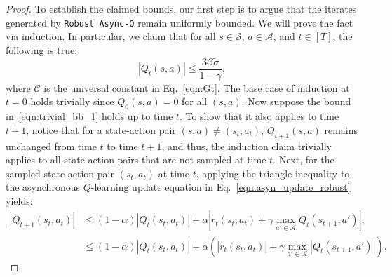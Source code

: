 \documentclass{article}
\begin{document}
\begin{proof}
To establish the claimed bounds, our first step is to argue that the iterates generated by \texttt{Robust Async-Q} remain uniformly bounded. We will prove the fact via induction. In particular, we claim that for all \(s \in \mathcal{S}\), \(a \in \mathcal{A}\), and \(t \in [T]\), the following is true: 
\begin{equation}\label{eqn:trivial_bb_1}
    \left| Q_t(s, a) \right| \le \frac{3 \mathcal{C} \tilde{\sigma}}{1 - \gamma},
\end{equation}
where $\mathcal{C}$ is the universal constant in Eq.~\eqref{eqn:Gt}. The base case of induction at $t=0$ holds trivially since $Q_0(s,a) = 0$ for all $(s,a)$. Now suppose the bound in~\eqref{eqn:trivial_bb_1} holds up to time $t$. To show that it also applies to time $t+1$, notice that for a state-action pair $(s, a) \neq (s_t, a_t)$,  $Q_{t+1}(s,a)$ remains unchanged from time $t$ to time $t+1$, and thus, the induction claim trivially applies to all state-action pairs that are not sampled at time $t$. Next, for the sampled state-action pair $(s_t, a_t)$ at time $t$, applying the triangle inequality to the asynchronous \(Q\)-learning update equation in Eq.~\eqref{eqn:asyn_update_robust} yields:
\begin{equation}\label{eqn:trivial_bb}
\begin{aligned}
\left| Q_{t+1}(s_t, a_t) \right| &\le (1 - \alpha) \left| Q_t(s_t, a_t) \right| + \alpha \left| \tilde{r}_t(s_t, a_t) + \gamma \max_{a' \in \mathcal{A}} Q_t(s_{t+1}, a') \right|, \\
&\le (1 - \alpha) \left| Q_t(s_t, a_t) \right| + \alpha \left( \left| \tilde{r}_t(s_t, a_t) \right| + \gamma \max_{a' \in \mathcal{A}} \left| Q_t(s_{t+1}, a') \right| \right).
\end{aligned}
\end{equation}


\end{proof}
\end{document}
